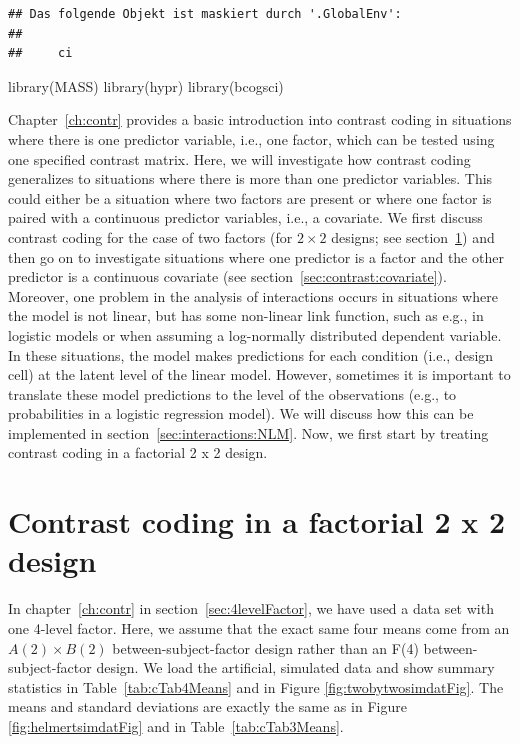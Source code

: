 \documentclass[
  12pt,
]{krantz}
\newenvironment{Shaded}{\begin{snugshade}}{\end{snugshade}}
\newcommand{\FunctionTok}[1]{\textcolor[rgb]{0.00,0.00,0.00}{#1}}
\newcommand{\NormalTok}[1]{#1}
\theoremstyle{definition}
\theoremstyle{definition}
\theoremstyle{definition}
\theoremstyle{definition}
\theoremstyle{remark}
\begin{document}
\begin{verbatim}
## Das folgende Objekt ist maskiert durch '.GlobalEnv':
## 
##     ci
\end{verbatim}

\begin{Shaded}
\begin{Highlighting}[]
\FunctionTok{library}\NormalTok{(MASS)}
\FunctionTok{library}\NormalTok{(hypr)}
\FunctionTok{library}\NormalTok{(bcogsci)}
\end{Highlighting}
\end{Shaded}

Chapter~\ref{ch:contr} provides a basic introduction into contrast coding in situations where there is one predictor variable, i.e., one factor, which can be tested using one specified contrast matrix. Here, we will investigate how contrast coding generalizes to situations where there is more than one predictor variables. This could either be a situation where two factors are present or where one factor is paired with a continuous predictor variables, i.e., a covariate. We first discuss contrast coding for the case of two factors (for \(2 \times 2\) designs; see section~\ref{sec:MR:ANOVA}) and then go on to investigate situations where one predictor is a factor and the other predictor is a continuous covariate (see section~\ref{sec:contrast:covariate}). Moreover, one problem in the analysis of interactions occurs in situations where the model is not linear, but has some non-linear link function, such as e.g., in logistic models or when assuming a log-normally distributed dependent variable. In these situations, the model makes predictions for each condition (i.e., design cell) at the latent level of the linear model. However, sometimes it is important to translate these model predictions to the level of the observations (e.g., to probabilities in a logistic regression model). We will discuss how this can be implemented in section~\ref{sec:interactions:NLM}. Now, we first start by treating contrast coding in a factorial 2 x 2 design.

\hypertarget{sec:MR:ANOVA}{%
\section{Contrast coding in a factorial 2 x 2 design}\label{sec:MR:ANOVA}}

In chapter~\ref{ch:contr} in section~\ref{sec:4levelFactor}, we have used a data set with one 4-level factor. Here, we assume that the exact same four means come from an \(A(2) \times B(2)\) between-subject-factor design rather than an F(4) between-subject-factor design. We load the artificial, simulated data and show summary statistics in Table~\ref{tab:cTab4Means} and in Figure \ref{fig:twobytwosimdatFig}. The means and standard deviations are exactly the same as in Figure \ref{fig:helmertsimdatFig} and in Table~\ref{tab:cTab3Means}.
\end{document}
